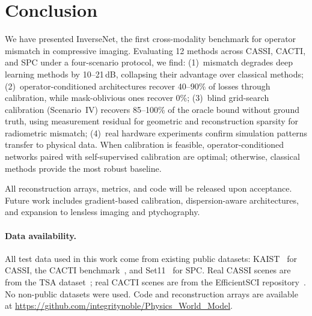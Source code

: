\documentclass[runningheads]{llncs}
\begin{document}
\section{Conclusion}
\label{sec:conclusion}

We have presented InverseNet, the first cross-modality benchmark for operator mismatch in compressive imaging.
Evaluating 12 methods across CASSI, CACTI, and SPC under a four-scenario protocol, we find:
(1)~mismatch degrades deep learning methods by 10--21\,dB, collapsing their advantage over classical methods;
(2)~operator-conditioned architectures recover 40--90\% of losses through calibration, while mask-oblivious ones recover 0\%;
(3)~blind grid-search calibration (Scenario~IV) recovers 85--100\% of the oracle bound without ground truth, using measurement residual for geometric and reconstruction sparsity for radiometric mismatch;
(4)~real hardware experiments confirm simulation patterns transfer to physical data.
When calibration is feasible, operator-conditioned networks paired with self-supervised calibration are optimal; otherwise, classical methods provide the most robust baseline.

All reconstruction arrays, metrics, and code will be released upon acceptance.
Future work includes gradient-based calibration, dispersion-aware architectures, and expansion to lensless imaging and ptychography.

\paragraph{Data availability.}
All test data used in this work come from existing public datasets: KAIST~\cite{choi2017kaist} for CASSI, the CACTI benchmark~\cite{yuan2021snapshot}, and Set11~\cite{kulkarni2016reconnet} for SPC. Real CASSI scenes are from the TSA dataset~\cite{wagadarikar2008cassi}; real CACTI scenes are from the EfficientSCI repository~\cite{wang2023efficientsci}. No non-public datasets were used. Code and reconstruction arrays are available at \url{https://github.com/integritynoble/Physics_World_Model}.
\end{document}
